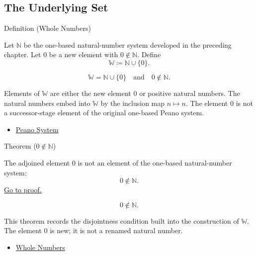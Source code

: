 \subsection*{The Underlying Set}

\begin{definitionbox}{Definition (Whole Numbers)}
\begin{definition}
\label{def:whole-numbers}
Let $\mathbb{N}$ be the one-based natural-number system developed in the
preceding chapter. Let $0$ be a new element with $0\notin\mathbb{N}$. Define
\[
\mathbb{W}\coloneqq \mathbb{N}\cup\{0\}.
\]
\end{definition}
\end{definitionbox}


\begin{remark*}
\[
\mathbb{W}=\mathbb{N}\cup\{0\}
\quad\text{and}\quad
0\notin\mathbb{N}.
\]
\end{remark*}

\begin{remark*}[Interpretation]
Elements of $\mathbb{W}$ are either the new element $0$ or positive natural
numbers. The natural numbers embed into $\mathbb{W}$ by the inclusion map
$n\mapsto n$. The element $0$ is not a successor-stage element of the original
one-based Peano system.
\end{remark*}

\begin{dependencies}
\begin{itemize}
  \item \hyperref[def:peano-system]{Peano System}
\end{itemize}
\end{dependencies}

\begin{theorembox}{Theorem (\texorpdfstring{$0\notin\mathbb{N}$}{0 not in N})}
\begin{theorem}
\label{thm:zero-not-in-n}
The adjoined element $0$ is not an element of the one-based natural-number
system:
\[
0\notin\mathbb{N}.
\]
\hyperref[prf:zero-not-in-n]{Go to proof.}
\end{theorem}
\end{theorembox}

\begin{remark*}
\[
0\notin\mathbb{N}.
\]
\end{remark*}

\begin{remark*}[Interpretation]
This theorem records the disjointness condition built into the construction
of $\mathbb{W}$. The element $0$ is new; it is not a renamed natural number.
\end{remark*}

\begin{dependencies}
\begin{itemize}
  \item \hyperref[def:whole-numbers]{Whole Numbers}
\end{itemize}
\end{dependencies}
